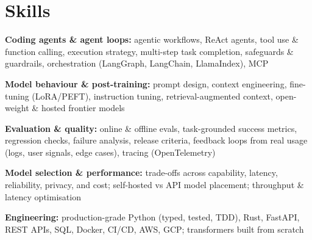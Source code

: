 \documentclass[10pt,a4paper]{article}
\begin{document}
\section{Skills}
\begin{tight}
  \item[\textcolor{accent}{\small$\bullet$}] \textbf{Coding agents \& agent loops:} agentic workflows, ReAct agents, tool use \& function calling, execution strategy, multi-step task completion, safeguards \& guardrails, orchestration (LangGraph, LangChain, LlamaIndex), MCP
  \item[\textcolor{accent}{\small$\bullet$}] \textbf{Model behaviour \& post-training:} prompt design, context engineering, fine-tuning (LoRA/PEFT), instruction tuning, retrieval-augmented context, open-weight \& hosted frontier models
  \item[\textcolor{accent}{\small$\bullet$}] \textbf{Evaluation \& quality:} online \& offline evals, task-grounded success metrics, regression checks, failure analysis, release criteria, feedback loops from real usage (logs, user signals, edge cases), tracing (OpenTelemetry)
  \item[\textcolor{accent}{\small$\bullet$}] \textbf{Model selection \& performance:} trade-offs across capability, latency, reliability, privacy, and cost; self-hosted vs API model placement; throughput \& latency optimisation
  \item[\textcolor{accent}{\small$\bullet$}] \textbf{Engineering:} production-grade Python (typed, tested, TDD), Rust, FastAPI, REST APIs, SQL, Docker, CI/CD, AWS, GCP; transformers built from scratch
\end{tight}

\end{document}
